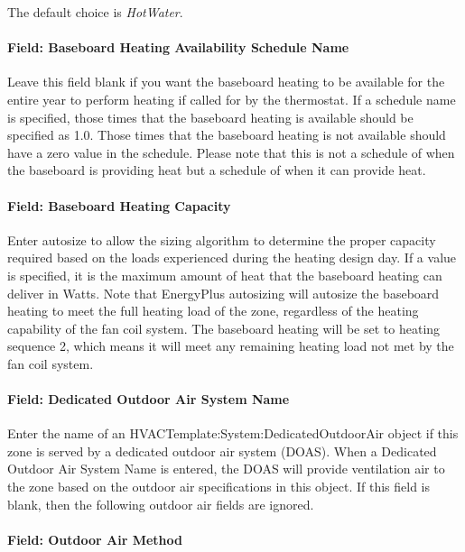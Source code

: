 The default choice is \emph{HotWater}.

\paragraph{Field: Baseboard Heating Availability Schedule Name}\label{field-baseboard-heating-availability-schedule-name}

Leave this field blank if you want the baseboard heating to be available for the entire year to perform heating if called for by the thermostat. If a schedule name is specified, those times that the baseboard heating is available should be specified as 1.0. Those times that the baseboard heating is not available should have a zero value in the schedule. Please note that this is not a schedule of when the baseboard is providing heat but a schedule of when it can provide heat.

\paragraph{Field: Baseboard Heating Capacity}\label{field-baseboard-heating-capacity}

Enter autosize to allow the sizing algorithm to determine the proper capacity required based on the loads experienced during the heating design day. If a value is specified, it is the maximum amount of heat that the baseboard heating can deliver in Watts. Note that EnergyPlus autosizing will autosize the baseboard heating to meet the full heating load of the zone, regardless of the heating capability of the fan coil system. The baseboard heating will be set to heating sequence 2, which means it will meet any remaining heating load not met by the fan coil system.

\paragraph{Field: Dedicated Outdoor Air System Name}\label{field-dedicated-outdoor-air-system-name}

Enter the name of an HVACTemplate:System:DedicatedOutdoorAir object if this zone is served by a dedicated outdoor air system (DOAS). When a Dedicated Outdoor Air System Name is entered, the DOAS will provide ventilation air to the zone based on the outdoor air specifications in this object. If this field is blank, then the following outdoor air fields are ignored.

\paragraph{Field: Outdoor Air Method}\label{field-outdoor-air-method-1}

